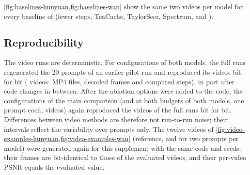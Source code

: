 \begin{figure}[t]
  \centering
  
\end{figure}

\begin{figure}[t]
  \centering
  
\end{figure}

\cref{fig:baselines-hunyuan,fig:baselines-wan} show the same two videos per model for every baseline of
 (fewer steps, TeaCache, TaylorSeer, Spectrum, \seacache and \ours).

\begin{figure}[t]
  \centering
  
\end{figure}

\begin{figure}[t]
  \centering
  
\end{figure}

\subsection{Reproducibility}
\label{supp:video-repro}
The video runs are deterministic. For \suppVidDetRuns{} configurations of both models, the full runs regenerated the 20
prompts of an earlier pilot run and reproduced its videos bit for bit (\suppVidDetVideos{} videos: MP4 files, decoded
frames and computed steps), in part after code changes in between. After the ablation options were added to the code,
the configurations of the main comparison (\seacache and \ours at both budgets of both models, one prompt each,
\suppVidDetAfter{} videos) again reproduced the videos of the full runs bit for bit. Differences between video methods
are therefore not run-to-run noise; their intervals reflect the variability over prompts only. The twelve videos of
\cref{fig:video-examples-hunyuan,fig:video-examples-wan} (reference, \seacache and \ours for two prompts per model)
were generated again for this supplement with the same code and seeds; their frames are bit-identical to those of the
evaluated videos, and their per-video PSNR equals the evaluated value.

